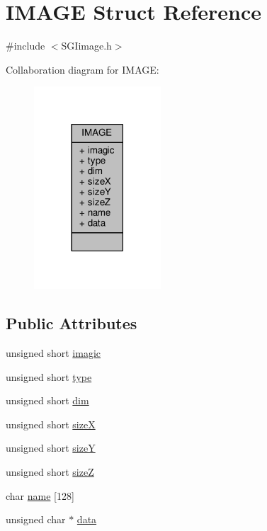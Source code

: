 \hypertarget{structIMAGE}{}\section{I\+M\+A\+G\+E Struct Reference}
\label{structIMAGE}


{\ttfamily \#include $<$S\+G\+Iimage.\+h$>$}



Collaboration diagram for I\+M\+A\+G\+E\+:\nopagebreak
\begin{figure}[H]
\begin{center}
\leavevmode
\includegraphics[width=134pt]{structIMAGE__coll__graph}
\end{center}
\end{figure}
\subsection*{Public Attributes}
\begin{DoxyCompactItemize}
\item 
unsigned short \hyperlink{structIMAGE_a29320b057d2ba7f683f5c40e030f9212}{imagic}
\item 
unsigned short \hyperlink{structIMAGE_a310120266ae4398ac530b966b3d43ef0}{type}
\item 
unsigned short \hyperlink{structIMAGE_a18e7e4c0817b235d0cce9d111805e68c}{dim}
\item 
unsigned short \hyperlink{structIMAGE_a9b60e1afa1748197e621d13d6565da24}{size\+X}
\item 
unsigned short \hyperlink{structIMAGE_ab61c98eaf9f32603dfcad280aa90d96b}{size\+Y}
\item 
unsigned short \hyperlink{structIMAGE_ad908fc81625a946abc3eefb3be97a4d5}{size\+Z}
\item 
char \hyperlink{structIMAGE_afc4faf915c6b6cb931fe3631dd29b071}{name} \mbox{[}128\mbox{]}
\item 
unsigned char $\ast$ \hyperlink{structIMAGE_ad2ba44cab5d6a790794d0c37a120453d}{data}
\end{DoxyCompactItemize}


